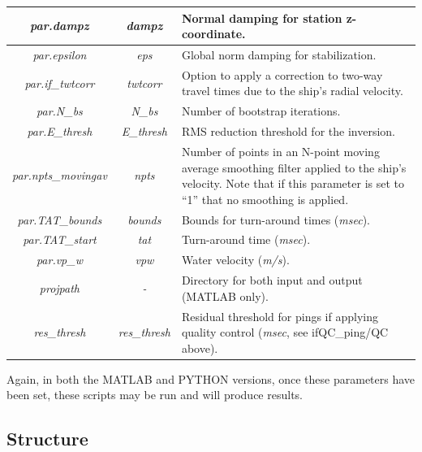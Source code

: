 \documentclass[titlepage]{article}
\begin{document}
\begin{table}[h!]
\begin{tabularx}{\linewidth}{|c|c|X|}
    \textit{par.dampz}          & \textit{dampz}             & Normal damping for station z-coordinate.\\ \hline
    \textit{par.epsilon}        & \textit{eps}               & Global norm damping for stabilization.\\ \hline
    \textit{par.if\_twtcorr}    & \textit{twtcorr}           & Option to apply a correction to two-way travel times due to the ship’s radial velocity.\\ \hline
    \textit{par.N\_bs}          & \textit{N\_bs}             & Number of bootstrap iterations.\\ \hline
    \textit{par.E\_thresh}      & \textit{E\_thresh}         & RMS reduction threshold for the inversion.\\ \hline
    \textit{par.npts\_movingav} & \textit{npts}              & Number of points in an N-point moving average smoothing filter applied to the ship’s velocity. Note that if this parameter is set to “1” that no smoothing is applied. \\ \hline
    \textit{par.TAT\_bounds}    & \textit{bounds}            & Bounds for turn-around times (\textit{msec}).\\ \hline
    \textit{par.TAT\_start}     & \textit{tat}               & Turn-around time (\textit{msec}).\\ \hline
    \textit{par.vp\_w}          & \textit{vpw}               & Water velocity (\textit{m/s}). \\ \hline
    \textit{projpath}           & \textit{-}                 & Directory for both input and output (MATLAB only). \\ \hline
    \textit{res\_thresh}        & \textit{res\_thresh}       & Residual threshold for pings if applying quality control (\textit{msec}, see ifQC\_ping/QC above).\\ \hline
   \end{tabularx}
  \end{table}

  Again, in both the MATLAB and PYTHON versions, once these parameters have been set, these scripts may be run and will produce results. 

  \subsection{Structure}
   
\end{document}

